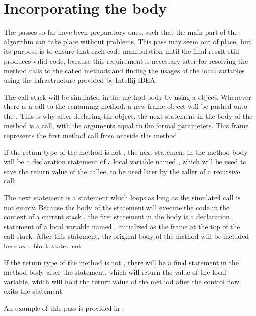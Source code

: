 \section{Incorporating the body}

The passes so far have been preparatory ones, such that the main part of the algorithm can take place without problems.
This pass may seem out of place, but its purpose is to ensure that each code manipulation until the final result still
produces valid code, because this requirement is necessary later for resolving the method calls to the called methods
and finding the usages of the local variables using the infrastructure provided by Intellij IDEA.

The call stack will be simulated in the method body by using a  object. Whenever there is a call to the
containing method, a new frame object will be pushed onto the . This is why after declaring the 
object, the next statement in the body of the method is a  call, with the arguments equal to the formal
parameters. This frame represents the first method call from outside this method.

If the return type of the method is not , the next statement in the method body will be a declaration
statement of a local variable named , which will be used to save the return value of the callee, to be used
later by the caller of a recursive call.

The next statement is a  statement which loops as long as the simulated call  is not empty.
Because the body of the statement will execute the code in the context of a current stack ,
the first statement in the  body is a declaration statement of a local variable named ,
initialized as the frame at the top of the call stack. After this statement, the original body of the method will be
included here as a block statement.

If the return type of the method is not , there will be a final  statement in the method body
after the  statement, which will return the value of the  local variable, which will hold the
return value of the method after the control flow exits the  statement.

An example of this pass is provided in .

